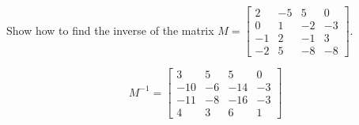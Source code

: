 
\begin{exerciseStatement}


Show how to find the inverse of the matrix \(M= \left[\begin{array}{cccc}
2 & -5 & 5 & 0 \\
0 & 1 & -2 & -3 \\
-1 & 2 & -1 & 3 \\
-2 & 5 & -8 & -8
\end{array}\right] \).


\end{exerciseStatement}
    
\begin{exerciseAnswer} 
\[M^{-1}= \left[\begin{array}{cccc}
3 & 5 & 5 & 0 \\
-10 & -6 & -14 & -3 \\
-11 & -8 & -16 & -3 \\
4 & 3 & 6 & 1
\end{array}\right] \]
\end{exerciseAnswer}
    
